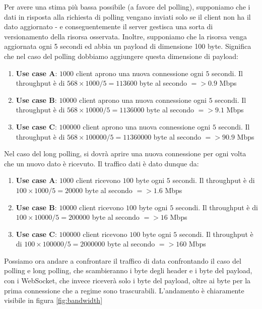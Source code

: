 \documentclass[12pt,a4paper,openright,twoside]{report}
\begin{document}
Per avere una stima più bassa possibile (a favore del polling), supponiamo che i dati in risposta alla richiesta di polling vengano inviati solo se il client non ha il dato aggiornato - e conseguentemente il server gestisca una sorta di versionamento della risorsa osservata. Inoltre, supponiamo che la risorsa venga aggiornata ogni 5 secondi ed abbia un payload di dimensione 100 byte. Significa che nel caso del polling dobbiamo aggiungere questa dimensione di payload:
\begin{enumerate}
\item \textbf{Use case A}: $1000$ client aprono una nuova connessione ogni $5$ secondi. Il throughput è di $568 \times 1000 / 5 = 113600$ byte al secondo $=> 0.9$ Mbps
\item \textbf{Use case B}: $10000$ client aprono una nuova connessione ogni $5$ secondi. Il throughput è di $568 \times 10000 / 5 = 1136000$ byte al secondo $=> 9.1$ Mbps
\item \textbf{Use case C}: $100000$ client aprono una nuova connessione ogni $5$ secondi. Il throughput è di $568 \times 100000 / 5 = 11360000$ byte al secondo $=> 90.9$ Mbps
\end{enumerate}

Nel caso del long polling, si dovrà aprire una nuova connessione per ogni volta che un nuovo dato è ricevuto. Il traffico dati è dato dunque da:
\begin{enumerate}
\item \textbf{Use case A}: $1000$ client ricevono $100$ byte ogni $5$ secondi. Il throughput è di $100 \times 1000 / 5 = 20000$ byte al secondo $=> 1.6$ Mbps
\item \textbf{Use case B}: $10000$ client ricevono $100$ byte ogni $5$ secondi. Il throughput è di $100 \times 10000 / 5 = 200000$ byte al secondo $=> 16$ Mbps
\item \textbf{Use case C}: $100000$ client ricevono $100$ byte ogni $5$ secondi. Il throughput è di $100 \times 100000 / 5 = 2000000$ byte al secondo $=> 160$ Mbps
\end{enumerate}

Possiamo ora andare a confrontare il traffico di data confrontando il caso del polling e long polling, che scambieranno i byte degli header e i byte del payload, con i WebSocket, che invece riceverà solo i byte del payload, oltre ai byte per la prima connessione che a regime sono trascurabili\cite{websocket_performance}. L'andamento è chiaramente visibile in figura \ref{fig:bandwidth}
\end{document}
